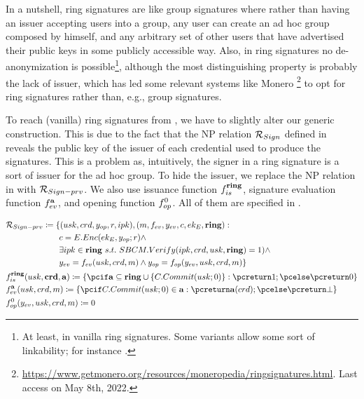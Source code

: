 In a nutshell, ring signatures \cite{rst06} are like group signatures where
rather than having an issuer accepting users into a group, any user can create
an ad hoc group composed by himself, and any arbitrary set of other users that
have advertised their public keys in some publicly accessible way. Also, in
ring signatures no de-anonymization is possible\footnote{At least, in vanilla
  ring signatures. Some variants allow some sort of linkability; for instance
  \cite{lww04}.}, although the most distinguishing property is probably the lack
of issuer, which has led some relevant systems like Monero%
\footnote{\url{https://www.getmonero.org/resources/moneropedia/ringsignatures.html}.
  Last access on May 8th, 2022.} to opt for ring signatures rather than, e.g.,
group signatures.

To reach (vanilla) ring signatures from \UAS, we have to slightly alter our
generic construction. This is due to the fact that the NP relation
$\mathcal{R}_{Sign}$ defined in  reveals the
public key of the issuer of each credential used to produce the signatures.
This is a problem as, intuitively, the signer in a ring
signature is a sort of issuer for the ad hoc group. To hide the issuer, we
replace the NP relation in  with
$\mathcal{R}_{Sign-prv}$. We also use issuance function $f_{is}^{\mathbf{ring}}$,
signature evaluation function $f_{ev}^{\mathbf{a}}$, and opening function
$f_{op}^0$. All of them are specified in .

\begin{align}
  & \NIZKRel_{\Sign-prv} \coloneqq \lbrace (\usk,\cred,\yinsp,r,
    \ipk),(\msg,\feval,\yeval,\Ec,\Eek,\sring): \nonumber \\
  & \hspace*{6.405em}\Ec = \EEnc(\Eek,\yinsp;r) \land \nonumber \\
  & \hspace*{6.40em}\exists \ipk \in \sring~\suchthat~\SBCMVerify(\ipk,\cred,\usk,
    \sring) = 1) \land \nonumber \\
  & \hspace*{6.40em}\yeval = \feval(\usk,\cred,\msg) \land
    \yinsp = \finsp(\yeval,\usk,\cred,\msg)
     \rbrace \nonumber \\
  & \fissue^{\sring}(\usk,\scred,\attrs) \coloneqq \lbrace \pcif \attrs
    \subseteq \sring \cup \lbrace \CCommit(\usk;0) \rbrace: \pcreturn 1; \pcelse
    \pcreturn 0 \rbrace \nonumber \\
  & \feval^{\attrs}(\usk,\cred,\msg) \coloneqq \lbrace \pcif \CCommit(\usk;0) \in
    \attrs: \pcreturn \attrs(\cred); \pcelse \pcreturn \bot \rbrace \nonumber \\
  & \finsp^0(\yeval,\usk,\cred,\msg) \coloneqq 0 \label{eq:uas-ring-funcs}
\end{align}


